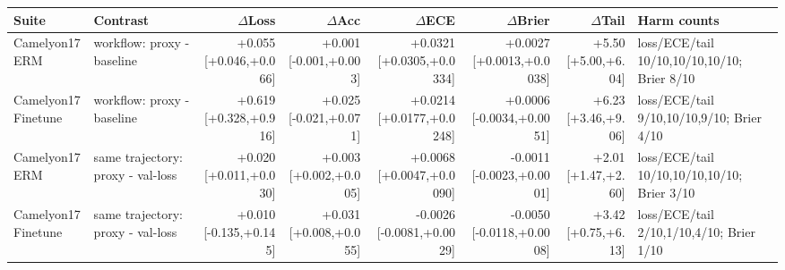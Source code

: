 \begin{tabular}{@{}llrrrrrl@{}}
  \toprule
  Suite & Contrast & $\Delta$Loss & $\Delta$Acc & $\Delta$ECE & $\Delta$Brier & $\Delta$Tail & Harm counts \\
  \midrule
  Camelyon17 ERM & workflow: proxy - baseline & +0.055 [+0.046,+0.066] & +0.001 [-0.001,+0.003] & +0.0321 [+0.0305,+0.0334] & +0.0027 [+0.0013,+0.0038] & +5.50 [+5.00,+6.04] & loss/ECE/tail 10/10,10/10,10/10; Brier 8/10 \\
  Camelyon17 Finetune & workflow: proxy - baseline & +0.619 [+0.328,+0.916] & +0.025 [-0.021,+0.071] & +0.0214 [+0.0177,+0.0248] & +0.0006 [-0.0034,+0.0051] & +6.23 [+3.46,+9.06] & loss/ECE/tail 9/10,10/10,9/10; Brier 4/10 \\
  \midrule
  Camelyon17 ERM & same trajectory: proxy - val-loss & +0.020 [+0.011,+0.030] & +0.003 [+0.002,+0.005] & +0.0068 [+0.0047,+0.0090] & -0.0011 [-0.0023,+0.0001] & +2.01 [+1.47,+2.60] & loss/ECE/tail 10/10,10/10,10/10; Brier 3/10 \\
  Camelyon17 Finetune & same trajectory: proxy - val-loss & +0.010 [-0.135,+0.145] & +0.031 [+0.008,+0.055] & -0.0026 [-0.0081,+0.0029] & -0.0050 [-0.0118,+0.0008] & +3.42 [+0.75,+6.13] & loss/ECE/tail 2/10,1/10,4/10; Brier 1/10 \\
  \bottomrule
\end{tabular}
